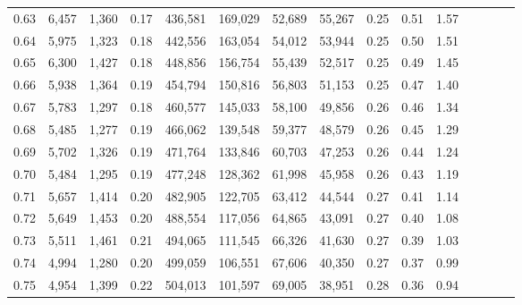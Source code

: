 \begin{tabular}{rrrcrrrrrrrrrrr}
0.63 &   6,457 &   1,360 &                                       0.17 &  436,581 &  169,029 &   52,689 &   55,267 &  0.25 &  0.51 &                         1.57 \\
0.64 &   5,975 &   1,323 &                                       0.18 &  442,556 &  163,054 &   54,012 &   53,944 &  0.25 &  0.50 &                         1.51 \\
0.65 &   6,300 &   1,427 &                                       0.18 &  448,856 &  156,754 &   55,439 &   52,517 &  0.25 &  0.49 &                         1.45 \\
0.66 &   5,938 &   1,364 &                                       0.19 &  454,794 &  150,816 &   56,803 &   51,153 &  0.25 &  0.47 &                         1.40 \\
0.67 &   5,783 &   1,297 &                                       0.18 &  460,577 &  145,033 &   58,100 &   49,856 &  0.26 &  0.46 &                         1.34 \\
0.68 &   5,485 &   1,277 &                                       0.19 &  466,062 &  139,548 &   59,377 &   48,579 &  0.26 &  0.45 &                         1.29 \\
0.69 &   5,702 &   1,326 &                                       0.19 &  471,764 &  133,846 &   60,703 &   47,253 &  0.26 &  0.44 &                         1.24 \\
0.70 &   5,484 &   1,295 &                                       0.19 &  477,248 &  128,362 &   61,998 &   45,958 &  0.26 &  0.43 &                         1.19 \\
0.71 &   5,657 &   1,414 &                                       0.20 &  482,905 &  122,705 &   63,412 &   44,544 &  0.27 &  0.41 &                         1.14 \\
0.72 &   5,649 &   1,453 &                                       0.20 &  488,554 &  117,056 &   64,865 &   43,091 &  0.27 &  0.40 &                         1.08 \\
0.73 &   5,511 &   1,461 &                                       0.21 &  494,065 &  111,545 &   66,326 &   41,630 &  0.27 &  0.39 &                         1.03 \\
0.74 &   4,994 &   1,280 &                                       0.20 &  499,059 &  106,551 &   67,606 &   40,350 &  0.27 &  0.37 &                         0.99 \\
0.75 &   4,954 &   1,399 &                                       0.22 &  504,013 &  101,597 &   69,005 &   38,951 &  0.28 &  0.36 &                         0.94 \\

\end{tabular}
